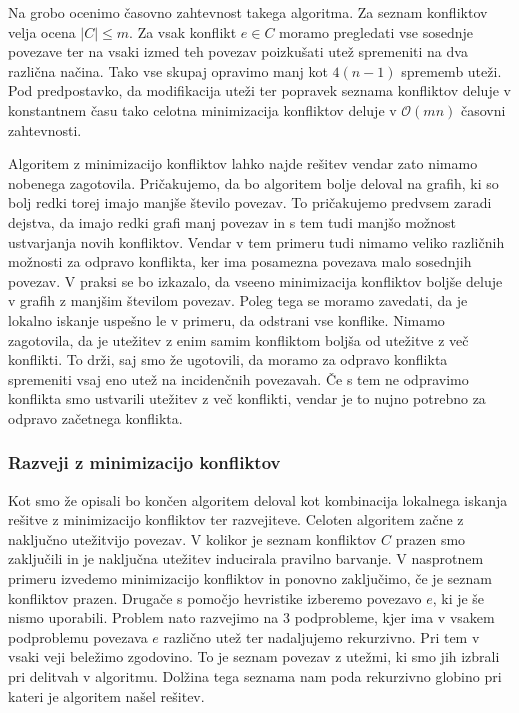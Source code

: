 \documentclass[12pt,a4paper,twoside]{article}
\theoremstyle{definition} %
\theoremstyle{plain} %
\numberwithin{equation}{section}  %
\begin{document}
Na grobo ocenimo časovno zahtevnost takega algoritma. Za seznam konfliktov velja ocena $|C| \le m$. Za vsak konflikt $e \in C$ moramo pregledati vse sosednje povezave ter na vsaki izmed teh povezav poizkušati utež spremeniti na dva različna načina. Tako vse skupaj opravimo manj kot $4(n-1)$ sprememb uteži. Pod predpostavko, da modifikacija uteži ter popravek seznama konfliktov deluje v konstantnem času tako celotna minimizacija konfliktov deluje v $\mathcal{O}(mn)$ časovni zahtevnosti.

Algoritem z minimizacijo konfliktov lahko najde rešitev vendar zato nimamo nobenega zagotovila. Pričakujemo, da bo algoritem bolje deloval na grafih, ki so bolj redki torej imajo manjše število povezav. To pričakujemo predvsem zaradi dejstva, da imajo redki grafi manj povezav in s tem tudi manjšo možnost ustvarjanja novih konfliktov. Vendar v tem primeru tudi nimamo veliko različnih možnosti za odpravo konflikta, ker ima posamezna povezava malo sosednjih povezav. V praksi se bo izkazalo, da vseeno minimizacija konfliktov boljše deluje v grafih z manjšim številom povezav. Poleg tega se moramo zavedati, da je lokalno iskanje uspešno le v primeru, da odstrani vse konflike. Nimamo zagotovila, da je utežitev z enim samim konfliktom boljša od utežitve z več konflikti. To drži, saj smo že ugotovili, da moramo za odpravo konflikta spremeniti vsaj eno utež na incidenčnih povezavah. Če s tem ne odpravimo konflikta smo ustvarili utežitev z več konflikti, vendar je to nujno potrebno za odpravo začetnega konflikta.

\subsubsection{Razveji z minimizacijo konfliktov}

Kot smo že opisali bo končen algoritem deloval kot kombinacija lokalnega iskanja rešitve z minimizacijo konfliktov ter razvejiteve. Celoten algoritem začne z naključno utežitvijo povezav. V kolikor je seznam konfliktov $C$ prazen smo zaključili in je naključna utežitev inducirala pravilno barvanje. V nasprotnem primeru izvedemo minimizacijo konfliktov in ponovno zaključimo, če je seznam konfliktov prazen. Drugače s pomočjo hevristike izberemo povezavo $e$, ki je še nismo uporabili. Problem nato razvejimo na $3$ podprobleme, kjer ima v vsakem podproblemu povezava $e$ različno utež ter nadaljujemo rekurzivno. Pri tem v vsaki veji beležimo zgodovino. To je seznam povezav z utežmi, ki smo jih izbrali pri delitvah v algoritmu. Dolžina tega seznama nam poda rekurzivno globino pri kateri je algoritem našel rešitev.
\end{document}
